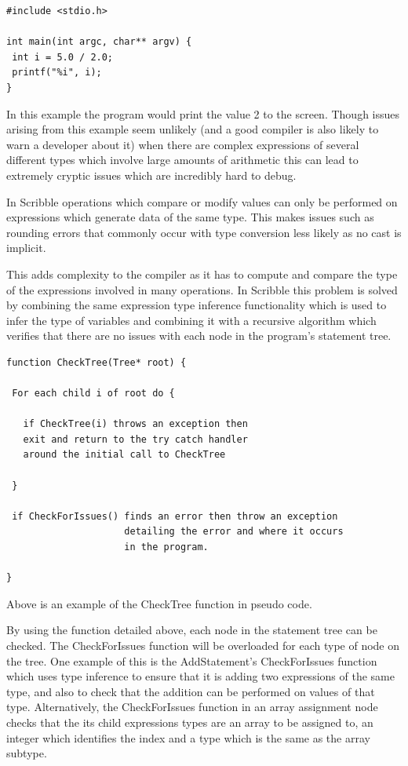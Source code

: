 \documentclass[]{final_report}
\begin{document}
\begin{verbatim}
#include <stdio.h>

int main(int argc, char** argv) {
 int i = 5.0 / 2.0;
 printf("%i", i);
}
\end{verbatim}

In this example the program would print the value 2 to the screen. Though issues arising from this example seem unlikely (and a good compiler is also likely to warn a developer about it) when there are complex expressions of several different types which involve large amounts of arithmetic this can lead to extremely cryptic issues which are incredibly hard to debug.

In Scribble operations which compare or modify values can only be performed on expressions which generate data of the same type. This makes issues such as rounding errors that commonly occur with type conversion less likely as no cast is implicit. 

This adds complexity to the compiler as it has to compute and compare the type of the expressions involved in many operations. In Scribble this problem is solved by combining the same expression type inference functionality which is used to infer the type of variables and combining it with a recursive algorithm which verifies that there are no issues with each node in the program's statement tree.

\begin{verbatim}
function CheckTree(Tree* root) {
 
 For each child i of root do {

   if CheckTree(i) throws an exception then 
   exit and return to the try catch handler 
   around the initial call to CheckTree
   
 }
 
 if CheckForIssues() finds an error then throw an exception 
 					 detailing the error and where it occurs 
 					 in the program.

}
\end{verbatim}
Above is an example of the CheckTree function in pseudo code.

By using the function detailed above, each node in the statement tree can be checked. The CheckForIssues function will be overloaded for each type of node on the tree. One example of this is the AddStatement's CheckForIssues function which uses type inference to ensure that it is adding two expressions of the same type, and also to check that the addition can be performed on values of that type. Alternatively, the CheckForIssues function in an array assignment node checks that the its child expressions types are an array to be assigned to, an integer which identifies the index and a type which is the same as the array subtype.
\end{document}
